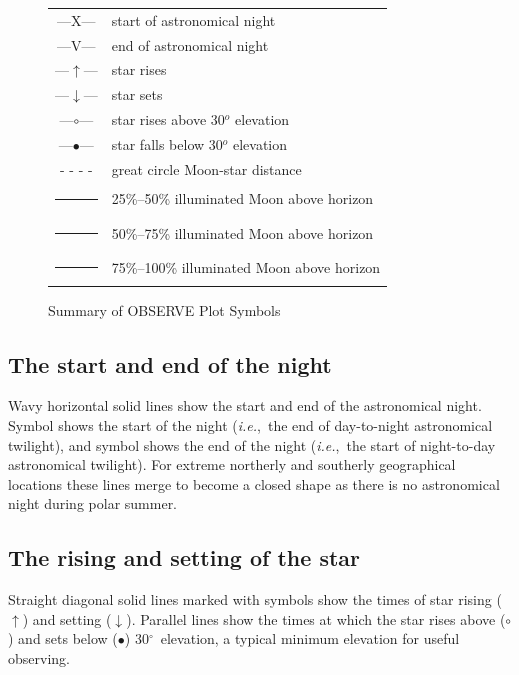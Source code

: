 \documentclass[11pt]{article}
\newcommand{\degrees}{\hbox{$^\circ$}}
\newcommand{\degrees}{{\rawhtml &deg;}}
\begin{document}
\begin{figure}[h]\caption{Summary of OBSERVE Plot Symbols}
\label{fig:sum}
\begin{center}
\begin{tabular}{|c|l|}
\hline
\large
---{\sf X}--- & start of astronomical night \\
---{\sf V}--- & end of astronomical night \\
---$\uparrow$--- & star rises \\
---$\downarrow$--- & star sets \\
---$\circ$--- & star rises above 30$^o$ elevation\\
---$\bullet$--- & star falls below 30$^o$ elevation\\
- - - - & great circle Moon-star distance \\
\rule{0.1mm}{4mm} & 25\%--50\% illuminated Moon above horizon\\
\rule{0.3mm}{4mm} & 50\%--75\% illuminated Moon above horizon\\
\rule{0.5mm}{4mm} & 75\%--100\% illuminated Moon above horizon\\
\hline
\end{tabular}
\end{center}
\end{figure}

\subsection{The start and end of the night}

Wavy horizontal solid lines show the start and end of the  astronomical
night.  Symbol {}  shows the start of the night ({\em{i.e.}},~the
end of day-to-night astronomical  twilight), and  symbol {} shows
the end of the night ({\em{i.e.}},~the start of night-to-day
astronomical twilight). For extreme  northerly and southerly
geographical locations these lines merge to become a closed shape as
there is no astronomical night during polar summer.

\subsection{The rising and setting of the star}

Straight diagonal solid lines marked with symbols  show the times of
star rising ($\uparrow$) and setting ($\downarrow$). Parallel lines
show the times at  which the star rises above ($\circ$) and sets below
($\bullet$) 30\degrees\ elevation, a typical minimum elevation for
useful observing.
\end{document}
